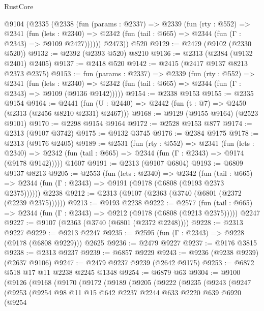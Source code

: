 \begin{lexlean}{RustCore}
\begin{coremodule}
    @9104
      (@2335
        (@2338
          (fun (params : @2337) =>
          @2339
            (fun (rty : @552) =>
            @2341
              (fun (lets : @2340) =>
              @2342 (fun (tail : @665) => @2344 (fun (Γ : @2343) => @9109 @2427))))))
        @2473))
    @520
@9129 := @2479 (@9102 (@2330 @520))
@9132 := @2392 (@2393 @520) @8210
@9136 := @2313 (@2384 (@9132 @2401) @2405)
@9137 := @2418 @520
@9142 := @2415 (@2417 @9137 @8213 @2373 @2375)
@9153 := fun (params : @2337) =>
  @2339
    (fun (rty : @552) =>
    @2341
      (fun (lets : @2340) =>
      @2342 (fun (tail : @665) => @2344 (fun (Γ : @2343) => @9109 (@9136 @9142)))))
@9154 := @2338 @9153
@9155 := @2335 @9154
@9164 := @2441 (fun (U : @2440) => @2442 (fun (t : @7) => @2450 (@2313 (@2456 @8210 @2331) @2467)))
@9168 := @9129 (@9155 @9164) (@2523 @9101)
@9170 := @2298 @9154 @9164
@9172 := @2528 @9153 @877
@9174 := @2313 (@9107 @3742)
@9175 := @9132 @3745
@9176 := @2384 @9175
@9178 := @2313 (@9176 @2405)
@9189 := @2531
    (fun (rty : @552) =>
    @2341
      (fun (lets : @2340) =>
      @2342 (fun (tail : @665) => @2344 (fun (Γ : @2343) => @9174 (@9178 @9142)))))
    @1607
@9191 := @2313 (@9107 @6804)
@9193 := @6809 @9137 @8213
@9205 := @2553
    (fun (lets : @2340) =>
    @2342
      (fun (tail : @665) => @2344 (fun (Γ : @2343) => @9191 (@9178 (@6808 (@9193 @2373 @2375))))))
    @2238
@9212 := @2313 (@9107 (@2363 (@3740 (@6801 (@2372 (@2239 @2375))))))
@9213 := @9193 @2238
@9222 := @2577
    (fun (tail : @665) => @2344 (fun (Γ : @2343) => @9212 (@9178 (@6808 (@9213 @2375)))))
    @2247
@9227 := @9107 (@2363 (@3740 (@6801 (@2372 @2248))))
@9228 := @2313 @9227
@9229 := @9213 @2247
@9235 := @2595 (fun (Γ : @2343) => @9228 (@9178 (@6808 @9229))) @2625
@9236 := @2479 @9227
@9237 := @9176 @3815
@9238 := @2313 @9237
@9239 := @6857 @9229
@9243 := @9236 (@9238 @9239) (@2637 @9106)
@9247 := @2479 @9237 @9239 (@2642 @9175)
@9253 := @6872 @518 @17 @11 @2238 @2245 @1348
@9254 := @6879 @63
@9304 := @9100
    (@9126
      (@9168
        (@9170
          (@9172
            (@9189
              (@9205
                (@9222
                  (@9235
                    (@9243
                      (@9247
                        (@9253
                          (@9254
                            @98
                            @11
                            @15
                            @642
                            @2237
                            @2244
                            @633
                            @2220
                            @639
                            @6920
                            (@9254

\end{coremodule}
\end{lexlean}
